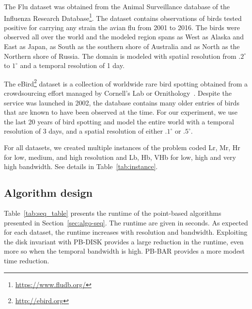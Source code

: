 \documentclass[10pt, conference, compsocconf]{IEEEtran}
\begin{document}
The Flu dataset was obtained from the Animal Surveillance
database of the Influenza Research
Database\footnote{\url{https://www.fludb.org/}}.
The dataset contains observations of birds tested positive for
carrying any strain the avian flu from 2001 to 2016. The birds were
observed all over the world and the modeled region spans as West as
Alaska and East as Japan, as South as the southern shore of Australia
and as North as the Northern shore of Russia. The domain is modeled
with spatial resolution from $.2^\circ$ to $1^\circ$ and a temporal
resolution of 1 day.

The eBird\footnote{\url{http://ebird.org}} dataset is a collection of worldwide rare bird spotting
obtained from a crowdsourcing effort managed by Cornell's Lab or
Ornithology~\cite{ebird}. Despite the service was launched in 2002,
the database contains many older entries of birds that are known to
have been observed at the time. For our experiment, we use the last 20
years of bird spotting and model the entire world with a temporal
resolution of 3 days, and a spatial resolution of either $.1^\circ$ or
$.5^\circ$.

For all datasets, we created multiple instances of the problem coded
Lr, Mr, Hr for low, medium, and high resolution and Lb, Hb, VHb for
low, high and very high bandwidth. See details in Table~\ref{tab:instance}. 

\begin{table}
    \resizebox{\linewidth}{!}{}
  \caption{Properties of the datasets. The domain is expressed in voxels
    and in MB. Spatial and temporal bandwidth are given in voxels.\vspace*{-2em}}
  \label{tab:instance}
\end{table}

\subsection{Algorithm design}


\begin{table}
  \resizebox{\linewidth}{!}{}
  \caption{Runtime of different algorithm. The speedup of PB-SYM over PB is given.  \vspace*{-3em}}
  \label{tab:seq_table}
\end{table}

Table~\ref{tab:seq_table} presents the runtime of the point-based
algorithms presented in Section~\ref{sec:algo-seq}. The runtime are
given in seconds. As expected for each dataset, the runtime increases
with resolution and bandwidth. Exploiting the disk invariant with
PB-DISK provides a large reduction in the runtime, even more so when
the temporal bandwidth is high. PB-BAR provides a more modest time
reduction.
\end{document}

